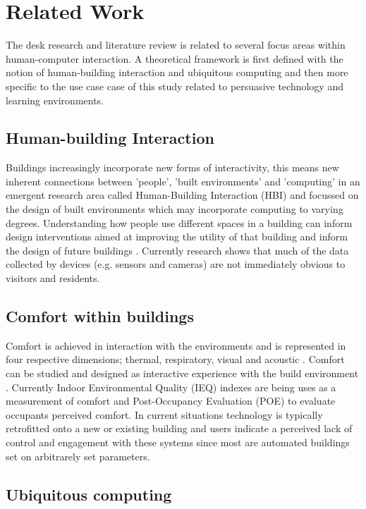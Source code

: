 \section{Related Work}

The desk research and literature review is related to several focus areas within human-computer interaction. A theoretical framework is first defined with the notion of human-building interaction and ubiquitous computing and then more specific to the use case case of this study related to persuasive technology and learning environments.

\subsection{Human-building Interaction}
Buildings increasingly incorporate new forms of interactivity, this means new inherent connections between 'people', 'built environments' and 'computing' in an emergent research area called Human-Building Interaction (HBI) \cite{hbi} and focussed on the design of built environments which may incorporate computing to varying degrees. Understanding how people use different spaces in a building can inform design interventions aimed at improving the utility of that building and inform the design of future buildings \cite{informed}. Currently research shows that much of the data collected by devices (e.g. sensors and cameras) are not immediately obvious to visitors and residents.

\subsection{Comfort within buildings}

Comfort is achieved in interaction with the environments and is represented in four respective dimensions; thermal, respiratory, visual and acoustic \cite{comfort}. Comfort can be studied and designed as interactive experience with the build environment \cite{environment}. Currently Indoor Environmental Quality (IEQ) indexes are being uses as a measurement of comfort and Post-Occupancy Evaluation (POE) to evaluate occupants perceived comfort. In current situations technology is typically retrofitted onto a new or existing building and users indicate a perceived lack of control and engagement with these systems since most are automated buildings set on arbitrarely set parameters. 

\subsection{Ubiquitous computing}

